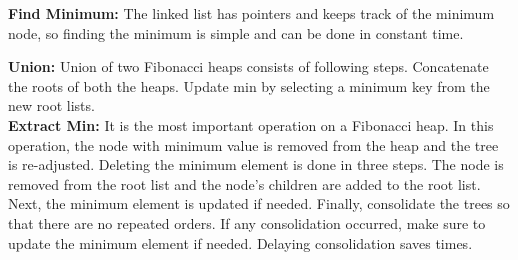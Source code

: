 \documentclass[a4paper, 12pt]{report}
\begin{document}
	\textbf{Find Minimum: }The linked list has pointers and keeps track of the minimum node, so finding the minimum is simple and can be done in constant time.
	
	\textbf{Union: }Union of two Fibonacci heaps consists of following steps. Concatenate the roots of both the heaps. Update min by selecting a minimum key from the new root lists.\\
	
	\textbf{Extract Min: }It is the most important operation on a Fibonacci heap. In this operation, the node with minimum value is removed from the heap and the tree is re-adjusted. Deleting the minimum element is done in three steps. The node is removed from the root list and the node’s children are added to the root list. Next, the minimum element is updated if needed. Finally, consolidate the trees so that there are no repeated orders. If any consolidation occurred, make sure to update the minimum element if needed. Delaying consolidation saves times.
	\cite{Fibonacci-Heap2}
	
\end{document}
